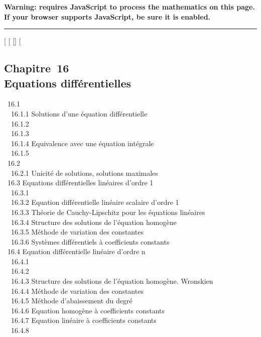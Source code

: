 \textbf{Warning: 
requires JavaScript to process the mathematics on this page.\\ If your
browser supports JavaScript, be sure it is enabled.}

\begin{center}\rule{3in}{0.4pt}\end{center}

{[}
{[}
{[}{]}
{[}

\subsection{Chapitre~16\\Equations différentielles}

~16.1  \\
~~16.1.1 {Solutions d'une
équation différentielle} \\ ~~16.1.2
 \\ ~~16.1.3
 \\
~~16.1.4 {Equivalence avec une
équation intégrale} \\ ~~16.1.5
 \\ ~16.2
 \\
~~16.2.1 {Unicité de solutions,
solutions maximales} \\ ~16.3
{Equations différentielles
linéaires d'ordre 1} \\ ~~16.3.1
 \\ ~~16.3.2
{Equation différentielle
linéaire scalaire d'ordre 1} \\ ~~16.3.3
{Théorie de Cauchy-Lipschitz
pour les équations linéaires} \\ ~~16.3.4
{Structure des solutions de
l'équation homogène} \\ ~~16.3.5
{Méthode de variation des
constantes} \\ ~~16.3.6
{Systèmes différentiels à
coefficients constants} \\ ~16.4
{Equation différentielle linéaire
d'ordre n} \\ ~~16.4.1
 \\ ~~16.4.2
 \\
~~16.4.3 {Structure des
solutions de l'équation homogène. Wronskien} \\ ~~16.4.4
{Méthode de variation des
constantes} \\ ~~16.4.5 {Méthode
d'abaissement du degré} \\ ~~16.4.6
{Equation homogène à
coefficients constants} \\ ~~16.4.7
{Equation linéaire à
coefficients constants} \\ ~~16.4.8
